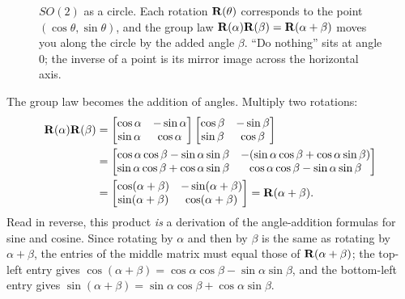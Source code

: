 \begin{figure}[H]
\centering
{}
\caption{$SO(2)$ as a circle. Each rotation $\mathbf{R}(\theta)$ corresponds to
the point $(\cos\theta,\sin\theta)$, and the group law
$\mathbf{R}(\alpha)\mathbf{R}(\beta)=\mathbf{R}(\alpha+\beta)$ moves you along the
circle by the added angle $\beta$. ``Do nothing'' sits at angle $0$; the inverse of
a point is its mirror image across the horizontal axis.}
\label{ch37:fig-so2circle}
\end{figure}

The group law becomes the addition of angles. Multiply two rotations:
\begin{align*}
  \mathbf{R}(\alpha)\mathbf{R}(\beta)
  &= \begin{bmatrix}\cos\alpha & -\sin\alpha\\ \sin\alpha & \cos\alpha\end{bmatrix}
     \begin{bmatrix}\cos\beta & -\sin\beta\\ \sin\beta & \cos\beta\end{bmatrix}\\
  &= \begin{bmatrix}\cos\alpha\cos\beta-\sin\alpha\sin\beta & -(\sin\alpha\cos\beta+\cos\alpha\sin\beta)\\
     \sin\alpha\cos\beta+\cos\alpha\sin\beta & \cos\alpha\cos\beta-\sin\alpha\sin\beta\end{bmatrix}\\
  &= \begin{bmatrix}\cos(\alpha+\beta) & -\sin(\alpha+\beta)\\ \sin(\alpha+\beta) & \cos(\alpha+\beta)\end{bmatrix}
  = \mathbf{R}(\alpha+\beta).
\end{align*}
Read in reverse, this product \emph{is} a derivation of the angle-addition
formulas for sine and cosine. Since rotating by $\alpha$ and then by $\beta$ is the
same as rotating by $\alpha+\beta$, the entries of the middle matrix must equal
those of $\mathbf{R}(\alpha+\beta)$; the top-left entry gives
$\cos(\alpha+\beta)=\cos\alpha\cos\beta - \sin\alpha\sin\beta$, and the bottom-left
entry gives $\sin(\alpha+\beta)=\sin\alpha\cos\beta+\cos\alpha\sin\beta$.

